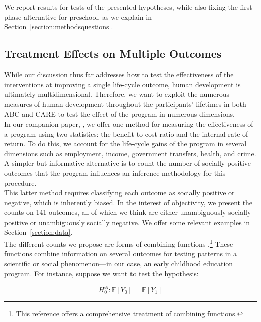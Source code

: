 \noindent We report results for tests of the presented hypotheses, while also fixing the first-phase alternative for preschool, as we explain in Section~\ref{section:methodsquestions}.

\subsection{Treatment Effects on Multiple Outcomes}

\noindent While our discussion thus far addresses how to test the effectiveness of the interventions at improving a single life-cycle outcome, human development is ultimately multidimensional. Therefore, we want to exploit the numerous measures of human development throughout the participants' lifetimes in both ABC and CARE to test the effect of the program in numerous dimensions. \\

\noindent In our companion paper, \citet{Elango_et_al_2015_ABC_unpublished}, we offer one method for measuring the effectiveness of a program using two statistics: the benefit-to-cost ratio and the internal rate of return. To do this, we account for the life-cycle gains of the program in several dimensions such as employment, income, government transfers, health, and crime. A simpler but informative alternative is to count the number of socially-positive outcomes that the program influences an inference methodology for this procedure.\\

\noindent This latter method requires classifying each outcome as socially positive or negative, which is inherently biased. In the interest of objectivity, we present the counts on 141 outcomes, all of which we think are either unambiguously socially positive or unambiguously socially negative. We offer some relevant examples in Section~\ref{section:data}.\\

\noindent The different counts we propose are forms of combining functions \citep{Pesarin_Salmaso_2010_PermutationTests}.\footnote{This reference offers a comprehensive treatment of combining functions.} These functions combine information on several outcomes for testing patterns in a scientific or social phenomenon---in our case, an early childhood education program. For instance, suppose we want to test the hypothesis: 

\begin{equation}
H_{0}^A: \mathbb{E} \left[ Y_{0} \right] =  \mathbb{E} \left[ Y_{1} \right] \label{eq:hoagain}
\end{equation}

